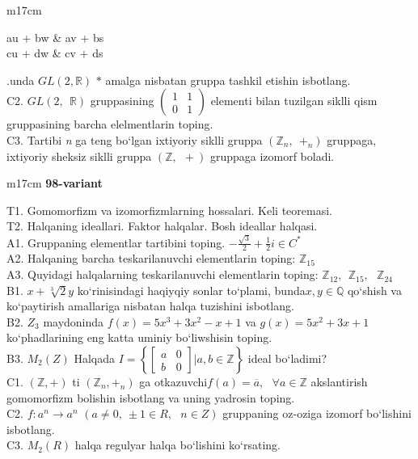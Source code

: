 \documentclass{article}
\begin{document}
\begin{tabular}{m{17cm}}
\begin{bmatrix}
au + bw & av + bs \\
cu + dw & cv + ds
\end{bmatrix}\).unda \(GL(2,\mathbb{R})\) \(*\) amalga nisbatan gruppa tashkil etishin isbotlang. \\
C2. \(GL(2,\mathbb{\ \ R})\) gruppasining \(\begin{pmatrix}
1 & 1 \\
0 & 1
\end{pmatrix}\) elementi bilan tuzilgan siklli qism gruppasining barcha elelmentlarin toping. \\
C3. Tartibi \emph{n} ga teng bo`lgan ixtiyoriy siklli gruppa \((\mathbb{Z}_{n},\ \  +_{n})\) gruppaga, ixtiyoriy sheksiz siklli gruppa \((\mathbb{Z},\ \  + )\) gruppaga izomorf boladi. \\

\end{tabular}
\vspace{1cm}


\begin{tabular}{m{17cm}}
\textbf{98-variant}
\newline

T1. Gomomorfizm va izomorfizmlarning hossalari. Keli teoremasi. \\
T2. Halqaning ideallari. Faktor halqalar. Bosh ideallar halqasi. \\
A1. Gruppaning elementlar tartibini toping. \(- \frac{\sqrt{3}}{2} + \frac{1}{2}i \in C^{*}\) \\
A2. Halqaning barcha teskarilanuvchi elementlarin toping: \(\mathbb{Z}_{15}\) \\
A3. Quyidagi halqalarning teskarilanuvchi elementlarin toping: \(\mathbb{Z}_{12},\ \ \mathbb{Z}_{15},\ \ \ \mathbb{Z}_{24}\) \\
B1. \(x + \sqrt[3]{2}y\) ko`rinisindagi haqiyqiy sonlar to`plami, bunda\(x,y\mathbb{\in Q}\) qo`shish va ko`paytirish amallariga nisbatan halqa tuzishini isbotlang. \\
B2. \(Z_{3}\) maydoninda \(f(x) = 5x^{3} + 3x^{2} - x + 1\) va \(g(x) = 5x^{2} + 3x + 1\) ko`phadlarining eng katta uminiy bo`liwshisin toping. \\
B3. \(M_{2}(Z)\) Halqada \(I = \left\{ \begin{bmatrix}
a & 0 \\
b & 0
\end{bmatrix}|a,b\mathbb{\in Z} \right\}\) ideal bo`ladimi? \\
C1. \(\left( \mathbb{Z}, + \right)\) ti \(\left( \mathbb{Z}_{n}, +_{n} \right)\) ga o\textquotesingle tkazuvchi\(f(a) = \overline{a},\ \ \ \forall a\mathbb{\in Z}\) akslantirish gomomorfizm bolishin isbotlang va uning yadrosin toping. \\
C2. \(f:a^{n} \rightarrow a^{n}\) \((a \neq 0,\  \pm 1 \in R,\ \ \ n \in Z)\) gruppaning o\textquotesingle z-o\textquotesingle ziga izomorf bo`lishini isbotlang. \\
C3. \(M_{2}(R)\) halqa regulyar halqa bo`lishini ko`rsating. \\

\end{tabular}
\vspace{1cm}
\end{document}
